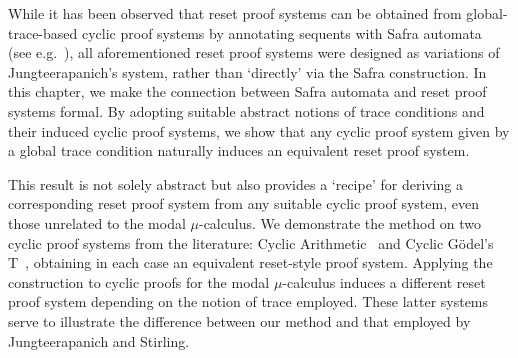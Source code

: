 While it has been observed that reset proof systems can be obtained from
global-trace-based cyclic proof systems by annotating sequents with Safra
automata~\parencite{safraComplexityOmegaAutomata1988} (see e.g.\
\cite{jungteerapanichTableauSystemsModal2010,martiFocusSystemAlternationFree2021}),
all aforementioned reset proof systems were designed as variations of
Jungteerapanich's system, rather than `directly' via the Safra construction.
In this chapter, we make the connection between Safra automata and reset
proof systems formal. By adopting suitable abstract notions of trace conditions and
their induced cyclic proof systems, we show that any
cyclic proof system given by a global trace
condition naturally induces an equivalent reset proof system.

This result is not solely abstract but also provides a `recipe' for deriving
a corresponding reset proof system from any suitable cyclic proof system, even
those unrelated to the modal $\mu$-calculus.
We demonstrate the method on two cyclic proof systems from the literature:
Cyclic Arithmetic~\parencite{simpsonCyclicArithmeticEquivalent2017} and Cyclic Gödel's
T~\parencite{dasCircularVersionGodel2021}, obtaining in each case an equivalent reset-style proof system. 
Applying the construction to cyclic proofs for the modal \( \mu \)-calculus induces
a different reset proof system depending on the notion of trace employed.
These latter systems serve to illustrate the difference
between our method and that employed by Jungteerapanich and Stirling.

